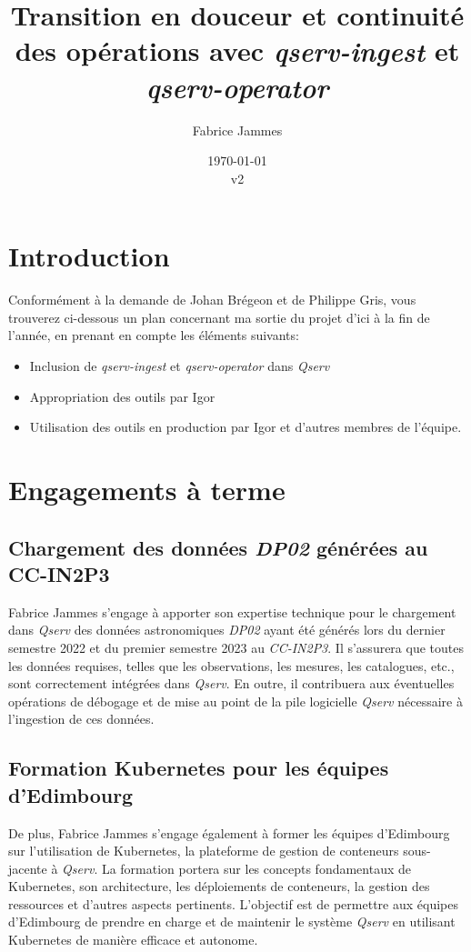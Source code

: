 \documentclass[french] {article}
\title{Transition en douceur et continuité des opérations avec \textit{qserv-ingest} et \textit{qserv-operator}}
\author{Fabrice Jammes}
\date{\today\\v2}
\begin{document}
\maketitle

\section{Introduction}

Conformément à la demande de Johan Brégeon et de Philippe Gris, vous trouverez ci-dessous un plan concernant ma sortie du projet d'ici à la fin de l'année, en prenant en compte les éléments suivants:

\begin{itemize}
\item Inclusion de \textit{qserv-ingest} et \textit{qserv-operator} dans \textit{Qserv}
\item Appropriation des outils par Igor
\item Utilisation des outils en production par Igor et d'autres membres de l'équipe.
\end{itemize}

\section{Engagements à terme}

\subsection{Chargement des données \textit{DP02} générées au CC-IN2P3}

Fabrice Jammes s'engage à apporter son expertise technique pour le chargement dans \textit{Qserv} des données astronomiques \textit{DP02} ayant été générés lors du dernier semestre 2022 et du premier semestre
2023 au \textit{CC-IN2P3}.
Il s'assurera que toutes les données requises, telles que les observations, les mesures, les catalogues, etc., sont correctement intégrées dans \textit{Qserv}. En outre, il contribuera aux éventuelles
opérations de débogage et de mise au point de la pile logicielle \textit{Qserv} nécessaire à l'ingestion de ces données.

\subsection{Formation Kubernetes pour les équipes d'Edimbourg}

De plus, Fabrice Jammes  s'engage également à former les équipes d'Edimbourg sur l'utilisation de Kubernetes, la plateforme de gestion de conteneurs sous-jacente à \textit{Qserv}. La formation portera sur les
concepts fondamentaux de Kubernetes, son architecture, les déploiements de conteneurs, la gestion des ressources et d'autres aspects pertinents. L'objectif est de permettre aux équipes d'Edimbourg de prendre
en charge et de maintenir le système \textit{Qserv} en utilisant Kubernetes de manière efficace et autonome.
\end{document}
